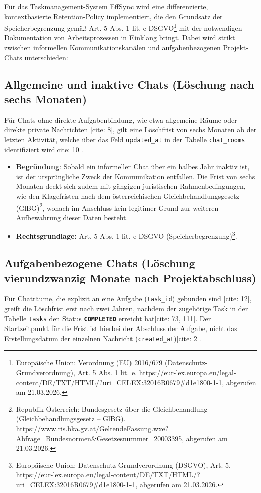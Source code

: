 Für das Taskmanagement-System EffSync wird eine differenzierte, kontextbasierte Retention-Policy implementiert, die den Grundsatz der Speicherbegrenzung gemäß Art. 5 Abs. 1 lit. e DSGVO\footnote{Europäische Union: Verordnung (EU) 2016/679 (Datenschutz-Grundverordnung), Art. 5 Abs. 1 lit. e. \url{https://eur-lex.europa.eu/legal-content/DE/TXT/HTML/?uri=CELEX:32016R0679\#d1e1800-1-1}, abgerufen am 21.03.2026.} mit der notwendigen Dokumentation von Arbeitsprozessen in Einklang bringt. Dabei wird strikt zwischen informellen Kommunikationskanälen und aufgabenbezogenen Projekt-Chats unterschieden:

\subsection{Allgemeine und inaktive Chats (Löschung nach sechs Monaten)}
Für Chats ohne direkte Aufgabenbindung, wie etwa allgemeine Räume oder direkte private Nachrichten [cite: 8], gilt eine Löschfrist von sechs Monaten ab der letzten Aktivität, welche über das Feld \texttt{updated\_at} in der Tabelle \texttt{chat\_rooms} identifiziert wird[cite: 10].

\begin{itemize}
    \item \textbf{Begründung}: Sobald ein informeller Chat über ein halbes Jahr inaktiv ist, ist der ursprüngliche Zweck der Kommunikation entfallen. Die Frist von sechs Monaten deckt sich zudem mit gängigen juristischen Rahmenbedingungen, wie den Klagefristen nach dem österreichischen Gleichbehandlungsgesetz (GlBG)\footnote{Republik Österreich: Bundesgesetz über die Gleichbehandlung (Gleichbehandlungsgesetz – GlBG). \url{https://www.ris.bka.gv.at/GeltendeFassung.wxe?Abfrage=Bundesnormen&Gesetzesnummer=20003395}, abgerufen am 21.03.2026.}, wonach im Anschluss kein legitimer Grund zur weiteren Aufbewahrung dieser Daten besteht.
    \item \textbf{Rechtsgrundlage:} Art. 5 Abs. 1 lit. e DSGVO (Speicherbegrenzung)\footnote{Europäische Union: Datenschutz-Grundverordnung (DSGVO), Art. 5. \url{https://eur-lex.europa.eu/legal-content/DE/TXT/HTML/?uri=CELEX:32016R0679\#d1e1800-1-1}, abgerufen am 21.03.2026.}.
\end{itemize}

\subsection{Aufgabenbezogene Chats (Löschung vierundzwanzig Monate nach Projektabschluss)}
Für Chaträume, die explizit an eine Aufgabe (\texttt{task\_id}) gebunden sind [cite: 12], greift die Löschfrist erst nach zwei Jahren, nachdem der zugehörige Task in der Tabelle \texttt{tasks} den Status \textbf{\texttt{COMPLETED}} erreicht hat[cite: 73, 111]. Der Startzeitpunkt für die Frist ist hierbei der Abschluss der Aufgabe, nicht das Erstellungsdatum der einzelnen Nachricht (\texttt{created\_at})[cite: 2].

